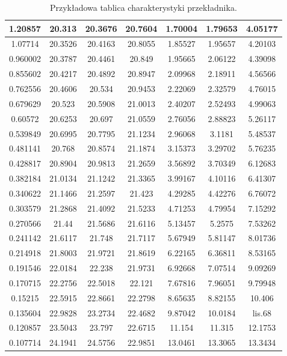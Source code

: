 \documentclass[12pt,a4paper]{article}
\begin{document}
\begin{table}[]
{\begin{tabular}{|c|c|c|c|c|c|c|}
		1.20857 & 20.313 & 20.3676 & 20.7604 & 1.70004 & 1.79653 & 4.05177 \\ \hline
		1.07714 & 20.3526 & 20.4163 & 20.8055 & 1.85527 & 1.95657 & 4.20103 \\ \hline
		0.960002 & 20.3787 & 20.4461 & 20.849 & 1.95665 & 2.06122 & 4.39098 \\ \hline
		0.855602 & 20.4217 & 20.4892 & 20.8947 & 2.09968 & 2.18911 & 4.56566 \\ \hline
		0.762556 & 20.4606 & 20.534 & 20.9453 & 2.22069 & 2.32579 & 4.76015 \\ \hline
		0.679629 & 20.523 & 20.5908 & 21.0013 & 2.40207 & 2.52493 & 4.99063 \\ \hline
		0.60572 & 20.6253 & 20.697 & 21.0559 & 2.76056 & 2.88823 & 5.26117 \\ \hline
		0.539849 & 20.6995 & 20.7795 & 21.1234 & 2.96068 & 3.1181 & 5.48537 \\ \hline
		0.481141 & 20.768 & 20.8574 & 21.1874 & 3.15373 & 3.29702 & 5.76235 \\ \hline
		0.428817 & 20.8904 & 20.9813 & 21.2659 & 3.56892 & 3.70349 & 6.12683 \\ \hline
		0.382184 & 21.0134 & 21.1242 & 21.3365 & 3.99167 & 4.10116 & 6.41307 \\ \hline
		0.340622 & 21.1466 & 21.2597 & 21.423 & 4.29285 & 4.42276 & 6.76072 \\ \hline
		0.303579 & 21.2868 & 21.4092 & 21.5233 & 4.71253 & 4.79954 & 7.15292 \\ \hline
		0.270566 & 21.44 & 21.5686 & 21.6116 & 5.13457 & 5.2575 & 7.53262 \\ \hline
		0.241142 & 21.6117 & 21.748 & 21.7117 & 5.67949 & 5.81147 & 8.01736 \\ \hline
		0.214918 & 21.8003 & 21.9721 & 21.8619 & 6.22165 & 6.36811 & 8.53165 \\ \hline
		0.191546 & 22.0184 & 22.238 & 21.9731 & 6.92668 & 7.07514 & 9.09269 \\ \hline
		0.170715 & 22.2756 & 22.5018 & 22.121 & 7.67816 & 7.96051 & 9.79948 \\ \hline
		0.15215 & 22.5915 & 22.8661 & 22.2798 & 8.65635 & 8.82155 & 10.406 \\ \hline
		0.135604 & 22.9828 & 23.2734 & 22.4682 & 9.87042 & 10.0184 & lis.68 \\ \hline
		0.120857 & 23.5043 & 23.797 & 22.6715 & 11.154 & 11.315 & 12.1753 \\ \hline
		0.107714 & 24.1941 & 24.5756 & 22.9851 & 13.0461 & 13.3065 & 13.3434 \\ \hline
	\end{tabular}}
	\caption{\label{tab:ctchar}Przykładowa tablica charakterystyki przekładnika.}
\end{table}
\end{document}
